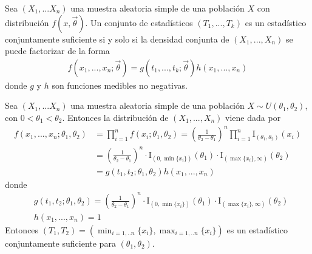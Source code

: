 \begin{teo}
    Sea $(X_1,...X_n)$ una muestra aleatoria simple de una población $X$ con distribución $f(x,\overrightarrow{\theta})$. Un conjunto de estadísticos $(T_1,...,T_k)$ es un estadístico conjuntamente suficiente si y solo si la densidad conjunta de $(X_1,...,X_n)$ se puede factorizar de la forma
    \begin{align*}
        f(x_1,...,x_n;\overrightarrow{\theta}) = g(t_1,...,t_k;\overrightarrow{\theta})h(x_1,...,x_n)
    \end{align*}
    donde $g$ y $h$ son funciones medibles no negativas.
\end{teo}

\begin{ejemplo}
    Sea $(X_1,...X_n)$ una muestra aleatoria simple de una población $X \sim U(\theta_1,\theta_2)$, con $0 < \theta_1 < \theta_2$. Entonces la distribución de $(X_1,...,X_n)$ viene dada por
    \begin{align*}
        f(x_1,...,x_n;\theta_1,\theta_2) & = \prod_{i=1}^{n}{f(x_i;\theta_1,\theta_2)} = \left( \frac{1}{\theta_2 - \theta_1}\right)^n \prod_{i=1}^{n}{\text{I}_{(\theta_1,\theta_2)}(x_i)} \\
                                         & = \left( \frac{1}{\theta_2 - \theta_1}\right)^n \cdot \text{I}_{(0,\min\{x_i\})}(\theta_1) \cdot \text{I}_{(\max\{x_i\},\infty)}(\theta_2)       \\
                                         & = g(t_1,t_2;\theta_1,\theta_2) h(x_1,...,x_n)
    \end{align*}
    donde
    \begin{align*}
         & g(t_1,t_2;\theta_1,\theta_2) = \left( \frac{1}{\theta_2 - \theta_1}\right)^n \cdot \text{I}_{(0,\min\{x_i\})}(\theta_1) \cdot \text{I}_{(\max\{x_i\},\infty)}(\theta_2) \\
         & h(x_1,...,x_n) = 1
    \end{align*}
    Entonces $(T_1,T_2) = (\min_{i=1,..n}\{x_i\}, \max_{i=1,..n}\{x_i\})$ es un estadístico conjuntamente suficiente para $(\theta_1,\theta_2)$.
\end{ejemplo}

